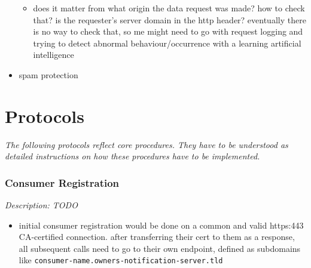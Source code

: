 \documentclass[12pt,english,a4paper,titlepage,cleardoublepage=empty,dottedtoc]{report}
\providecommand{\tightlist}{%
  \setlength{\itemsep}{0pt}\setlength{\parskip}{0pt}}
\begin{document}
\begin{itemize}
  \begin{itemize}
  \tightlist
  \item
    does it matter from what origin the data request was made? how to
    check that? is the requester's server domain in the http header?
    eventually there is no way to check that, so me might need to go
    with request logging and trying to detect abnormal
    behaviour/occurrence with a learning artificial intelligence
  \end{itemize}
\item
  spam protection
\end{itemize}

\section{Protocols}\label{protocols}

\emph{The following protocols reflect core procedures. They have to be
understood as detailed instructions on how these procedures have to be
implemented.}

\subsubsection{Consumer Registration}\label{consumer-registration}

\emph{Description: TODO}

\begin{itemize}
\tightlist
\item
  initial consumer registration would be done on a common and valid
  https:443 CA-certified connection. after transferring their cert to
  them as a response, all subsequent calls need to go to their own
  endpoint, defined as subdomains like
  \texttt{consumer-name.owners-notification-server.tld}
\end{itemize}
\end{document}
